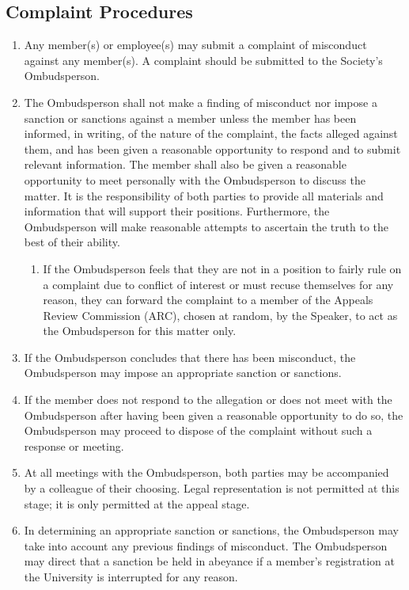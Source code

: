 \subsection{Complaint Procedures}
\begin{enumerate} [align=left]
\item Any member(s) or employee(s) may submit a complaint of misconduct against any member(s). A complaint should be submitted to the Society's Ombudsperson.
\item The Ombudsperson shall not make a finding of misconduct nor impose a sanction or sanctions against a member unless the member has been informed, in writing, of the nature of the complaint, the facts alleged against them, and has been given a reasonable opportunity to respond and to submit relevant information. The member shall also be given a reasonable opportunity to meet personally with the Ombudsperson to discuss the matter. It is the responsibility of both parties to provide all materials and information that will support their positions. Furthermore, the Ombudsperson will make reasonable attempts to ascertain the truth to the best of their ability.
\begin{enumerate} [label*=\arabic*., align=left]
\item If the Ombudsperson feels that they are not in a position to fairly rule on a complaint due to conflict of interest or must recuse themselves for any reason, they can forward the complaint to a member of the Appeals Review Commission (ARC), chosen at random, by the Speaker, to act as the Ombudsperson for this matter only.
\end{enumerate}
\item If the Ombudsperson concludes that there has been misconduct, the Ombudsperson may impose an appropriate sanction or sanctions.
\item If the member does not respond to the allegation or does not meet with the Ombudsperson after having been given a reasonable opportunity to do so, the Ombudsperson may proceed to dispose of the complaint without such a response or meeting.
\item At all meetings with the Ombudsperson, both parties may be accompanied by a colleague of their choosing. Legal representation is not permitted at this stage; it is only permitted at the appeal stage. \item In determining an appropriate sanction or sanctions, the Ombudsperson may take into account any previous findings of misconduct. The Ombudsperson may direct that a sanction be held in abeyance if a member's registration at the University is interrupted for any reason.

\end{enumerate}
